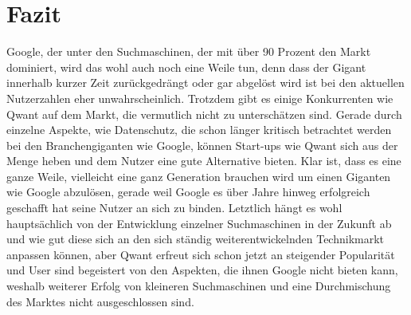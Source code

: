 \chapter{Fazit}\label{ch:fazit2}

Google, der  unter den Suchmaschinen, der mit über 90 Prozent den Markt dominiert,
wird das wohl auch noch eine Weile tun, denn dass der Gigant innerhalb kurzer Zeit zurückgedrängt oder gar abgelöst wird ist bei den aktuellen Nutzerzahlen eher unwahrscheinlich.
Trotzdem gibt es einige Konkurrenten wie Qwant auf dem Markt, die vermutlich nicht zu unterschätzen sind.
Gerade durch einzelne Aspekte, wie Datenschutz, die schon länger kritisch betrachtet werden bei den Branchengiganten wie Google,
können Start-ups wie Qwant sich aus der Menge heben und dem Nutzer eine gute Alternative bieten.
Klar ist, dass es eine ganze Weile, vielleicht eine ganz Generation brauchen wird um einen Giganten wie Google abzulösen,
gerade weil Google es über Jahre hinweg erfolgreich geschafft hat seine Nutzer an sich zu binden.
Letztlich hängt es wohl hauptsächlich von der Entwicklung einzelner Suchmaschinen in der Zukunft ab und wie gut diese sich an den sich ständig weiterentwickelnden Technikmarkt anpassen können,
aber Qwant erfreut sich schon jetzt an steigender Popularität und User sind begeistert von den Aspekten, die ihnen Google nicht bieten kann,
weshalb weiterer Erfolg von kleineren Suchmaschinen und eine Durchmischung des Marktes nicht ausgeschlossen sind.